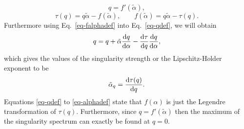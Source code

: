 %
%
\begin{equation}
\label{eq-qdef}
 q=f'(\tilde{\alpha}),
\end{equation}
%
\begin{equation}
 \label{eq-falphadef}
 \tau(q)=q\tilde{\alpha}-f(\tilde{\alpha}),\qquad 
 f(\tilde{\alpha})=q\tilde{\alpha}-\tau(q).
\end{equation}
%
Furthermore using Eq.~\eqref{eq-falphadef} into Eq.~\eqref{eq-qdef}, we will obtain
%
\begin{equation}
 q=q+\tilde{\alpha}\frac{\mathrm{d} q}{\mathrm{d}\alpha}-\frac{\mathrm{d}\tau}{\mathrm{d} q}\frac{\mathrm{d} q}{\mathrm{d}\alpha},
\end{equation}
which gives the values of the singularity strength or the Lipschitz-H$\ddot{o}$lder exponent to be
%
\begin{equation}
 \label{eq-alphadef}
 \tilde{\alpha}_q=\frac{\mathrm{d}\tau(q)}{\mathrm{d} q}.
\end{equation}
%
Equations \eqref{eq-qdef} to \eqref{eq-alphadef} state that $f(\alpha)$ is just the Legendre transformation of $\tau(q)$.
Furthermore, since $q=f'(\tilde{\alpha})$ then the maximum of the singularity spectrum can exactly be found at $q=0$.


